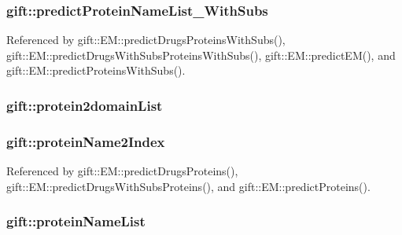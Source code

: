 \subsubsection[{\texorpdfstring{predict\+Protein\+Name\+List\+\_\+\+With\+Subs}{predictProteinNameList\_WithSubs}}]{ gift\+::predict\+Protein\+Name\+List\+\_\+\+With\+Subs}\hypertarget{namespacegift_a03aaa96d826b6a887accc3951939ccde}{}\label{namespacegift_a03aaa96d826b6a887accc3951939ccde}


Referenced by gift\+::\+E\+M\+::predict\+Drugs\+Proteins\+With\+Subs(), gift\+::\+E\+M\+::predict\+Drugs\+With\+Subs\+Proteins\+With\+Subs(), gift\+::\+E\+M\+::predict\+E\+M(), and gift\+::\+E\+M\+::predict\+Proteins\+With\+Subs().

\subsubsection[{\texorpdfstring{protein2domain\+List}{protein2domainList}}]{ gift\+::protein2domain\+List}\hypertarget{namespacegift_aa113a7a90b1c3c70d1ab252eb34816fe}{}\label{namespacegift_aa113a7a90b1c3c70d1ab252eb34816fe}
\subsubsection[{\texorpdfstring{protein\+Name2\+Index}{proteinName2Index}}]{ gift\+::protein\+Name2\+Index}\hypertarget{namespacegift_ad49c613c81da3c4189ea4f16915c60c5}{}\label{namespacegift_ad49c613c81da3c4189ea4f16915c60c5}


Referenced by gift\+::\+E\+M\+::predict\+Drugs\+Proteins(), gift\+::\+E\+M\+::predict\+Drugs\+With\+Subs\+Proteins(), and gift\+::\+E\+M\+::predict\+Proteins().

\subsubsection[{\texorpdfstring{protein\+Name\+List}{proteinNameList}}]{ gift\+::protein\+Name\+List}\hypertarget{namespacegift_ac03221463832a0531081c053ed10bafd}{}\label{namespacegift_ac03221463832a0531081c053ed10bafd}


